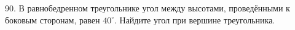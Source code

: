 90. В равнобедренном треугольнике угол между высотами, проведёнными к боковым сторонам, равен $40^\circ.$ Найдите угол при вершине треугольника.\\
